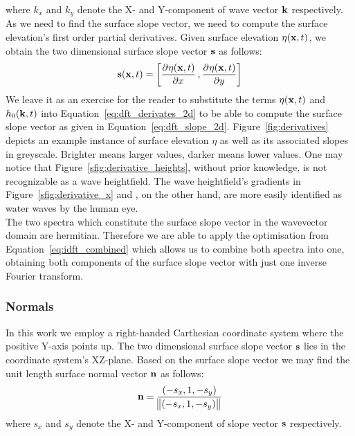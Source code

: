 where $k_x$ and $k_y$ denote the X- and Y-component of wave vector $\mathbf{k}$ 
respectively. As we need to find the surface slope vector, we need to compute 
the surface elevation's first order partial derivatives. Given surface 
elevation $\eta(\mathbf{x},t)$, we obtain the two dimensional surface slope 
vector $\mathbf{s}$ as follows:
\begin{equation}
\label{eq:dft_slope_2d}
 \mvec{s}(\mvec{x},t) = \left[\dpd{\eta(\mvec{x},t)}{x}, \dpd{\eta(\mvec{x},t)}{y}\right]
\end{equation}
We leave it as an exercise for the reader to substitute the terms $\eta(\mathbf{x},t)$
and $h_0(\mathbf{k},t)$ into Equation~\ref{eq:dft_derivates_2d} to be able to
compute the surface slope vector as given in Equation~\ref{eq:dft_slope_2d}.
Figure~\ref{fig:derivatives} depicts an example instance of surface 
elevation $\eta$ as well as its associated slopes in greyscale. Brighter 
means larger values, darker means lower values. One may notice that 
Figure~\ref{sfig:derivative_heights}, without prior knowledge, is not 
recognizable as a wave heightfield. The wave heightfield's gradients in
Figure~\ref{sfig:derivative_x} and , on the 
other hand, are more easily identified as water waves by the human eye.\\

The two spectra which constitute the surface slope vector in the wavevector domain
are hermitian. Therefore we are able to apply the optimisation from
Equation~\ref{eq:idft_combined} which allows us to combine both spectra into one,
obtaining both components of the surface slope vector with just one inverse Fourier transform.
%
\subsubsection{Normals}
%
In this work we employ a right-handed Carthesian coordinate system where the positive
Y-axis points up. The two dimensional surface slope vector $\mathbf{s}$ lies in the
coordinate system's XZ-plane. Based on the surface slope vector we may find the unit
length surface normal vector $\mathbf{n}$ as follows:
\begin{equation}
 \mathbf{n} = \frac{(-s_x, 1, -s_y)}{\norm{(-s_x, 1, -s_y)}}
\end{equation}
where $s_x$ and $s_y$ denote the X- and Y-component of slope vector $\mathbf{s}$ 
respectively.
%
